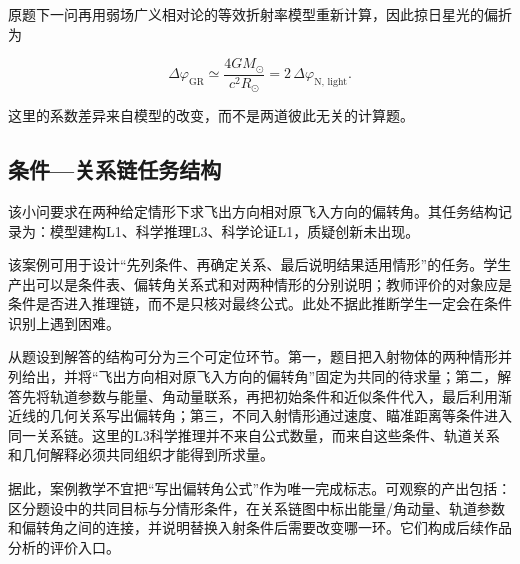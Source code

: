 \documentclass[
  12pt,
  a4paper]{ctexbook}
\begin{document}
原题下一问再用弱场广义相对论的等效折射率模型重新计算，因此掠日星光的偏折为

\[
\Delta\varphi_{\mathrm{GR}}
  \simeq \frac{4GM_\odot}{c^2R_\odot}
  =2\,\Delta\varphi_{\mathrm{N,\,light}}.
\]

这里的系数差异来自模型的改变，而不是两道彼此无关的计算题。

\subsection{条件---关系链任务结构}\label{ux6761ux4ef6ux5173ux7cfbux94feux4efbux52a1ux7ed3ux6784}

该小问要求在两种给定情形下求飞出方向相对原飞入方向的偏转角。其任务结构记录为：模型建构L1、科学推理L3、科学论证L1，质疑创新未出现。

该案例可用于设计``先列条件、再确定关系、最后说明结果适用情形''的任务。学生产出可以是条件表、偏转角关系式和对两种情形的分别说明；教师评价的对象应是条件是否进入推理链，而不是只核对最终公式。此处不据此推断学生一定会在条件识别上遇到困难。

从题设到解答的结构可分为三个可定位环节。第一，题目把入射物体的两种情形并列给出，并将``飞出方向相对原飞入方向的偏转角''固定为共同的待求量；第二，解答先将轨道参数与能量、角动量联系，再把初始条件和近似条件代入，最后利用渐近线的几何关系写出偏转角；第三，不同入射情形通过速度、瞄准距离等条件进入同一关系链。这里的L3科学推理并不来自公式数量，而来自这些条件、轨道关系和几何解释必须共同组织才能得到所求量。

据此，案例教学不宜把``写出偏转角公式''作为唯一完成标志。可观察的产出包括：区分题设中的共同目标与分情形条件，在关系链图中标出能量/角动量、轨道参数和偏转角之间的连接，并说明替换入射条件后需要改变哪一环。它们构成后续作品分析的评价入口。
\end{document}
